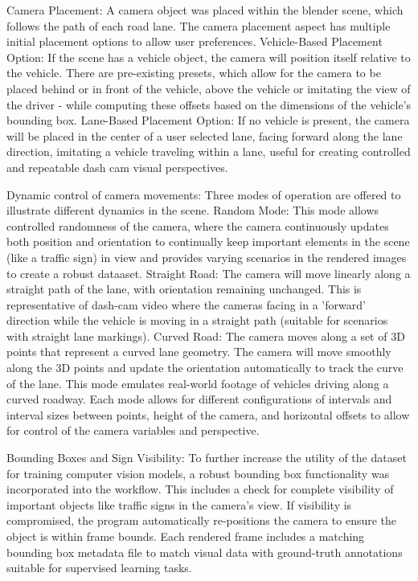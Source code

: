 \documentclass[journal]{IEEEtran}
\begin{document}
Camera Placement: A camera object was placed within the blender scene, which follows the path of each road lane. The camera placement aspect has multiple initial placement options to allow user preferences. 
Vehicle-Based Placement Option: If the scene has a vehicle object, the camera will position itself relative to the vehicle. There are pre-existing presets, which allow for the camera to be placed behind or in front of the vehicle, above the vehicle or imitating the view of the driver - while computing these offsets based on the dimensions of the vehicle's bounding box.
Lane-Based Placement Option: If no vehicle is present, the camera will be placed in the center of a user selected lane, facing forward along the lane direction, imitating a vehicle traveling within a lane, useful for creating controlled and repeatable dash cam visual perspectives.

Dynamic control of camera movements: Three modes of operation are offered to illustrate different dynamics in the scene. 
Random Mode: This mode allows controlled randomness of the camera, where the camera continuously updates both position and orientation to continually keep important elements in the scene (like a traffic sign) in view and provides varying scenarios in the rendered images to create a robust dataaset. 
Straight Road: The camera will move linearly along a straight path of the lane, with orientation remaining unchanged. This is representative of dash-cam video where the cameras facing in a 'forward' direction while the vehicle is moving in a straight path (suitable for scenarios with straight lane markings). 
Curved Road: The camera moves along a set of 3D points that represent a curved lane geometry. The camera will move smoothly along the 3D points and update the orientation automatically to track the curve of the lane. This mode emulates real-world footage of vehicles driving along a curved roadway. Each mode allows for different configurations of intervals and interval sizes between points, height of the camera, and horizontal offsets to allow for control of the camera variables and perspective.

Bounding Boxes and Sign Visibility: To further increase the utility of the dataset for training computer vision models, a robust bounding box functionality was incorporated into the workflow. This includes a check for complete visibility of important objects like traffic signs in the camera's view. If visibility is compromised, the program automatically re-positions the camera to ensure the object is within frame bounds. Each rendered frame includes a matching bounding box metadata file to match visual data with ground-truth annotations suitable for supervised learning tasks.
\end{document}
